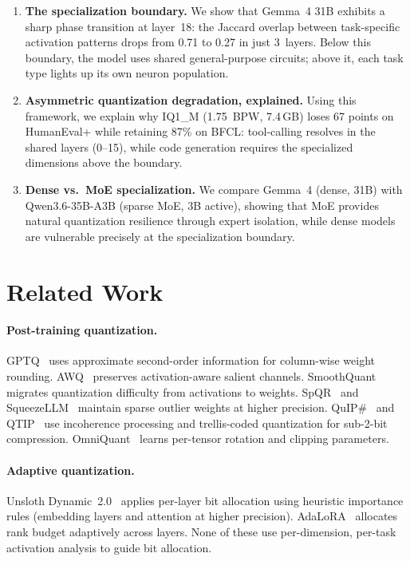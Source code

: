 \documentclass[11pt,a4paper]{article}
\begin{document}
\begin{enumerate}[leftmargin=*,itemsep=2pt]
\item \textbf{The specialization boundary.} We show that Gemma~4 31B exhibits a sharp phase transition at layer~18: the Jaccard overlap between task-specific activation patterns drops from 0.71 to 0.27 in just 3~layers. Below this boundary, the model uses shared general-purpose circuits; above it, each task type lights up its own neuron population.

\item \textbf{Asymmetric quantization degradation, explained.} Using this framework, we explain why IQ1\_M (1.75~BPW, 7.4\,GB) loses 67 points on HumanEval+ while retaining 87\% on BFCL: tool-calling resolves in the shared layers (0--15), while code generation requires the specialized dimensions above the boundary.

\item \textbf{Dense vs.\ MoE specialization.} We compare Gemma~4 (dense, 31B) with Qwen3.6-35B-A3B (sparse MoE, 3B active), showing that MoE provides natural quantization resilience through expert isolation, while dense models are vulnerable precisely at the specialization boundary.
\end{enumerate}

\section{Related Work}

\paragraph{Post-training quantization.} GPTQ~\citep{frantar2023gptq} uses approximate second-order information for column-wise weight rounding. AWQ~\citep{lin2024awq} preserves activation-aware salient channels. SmoothQuant~\citep{xiao2023smoothquant} migrates quantization difficulty from activations to weights. SpQR~\citep{dettmers2024spqr} and SqueezeLLM~\citep{kim2024squeezellm} maintain sparse outlier weights at higher precision. QuIP\#~\citep{tseng2024quipsharp} and QTIP~\citep{tseng2024qtip} use incoherence processing and trellis-coded quantization for sub-2-bit compression. OmniQuant~\citep{shao2024omniquant} learns per-tensor rotation and clipping parameters.

\paragraph{Adaptive quantization.} Unsloth Dynamic~2.0~\citep{unsloth2025} applies per-layer bit allocation using heuristic importance rules (embedding layers and attention at higher precision). AdaLoRA~\citep{zhang2023adalora} allocates rank budget adaptively across layers. None of these use per-dimension, per-task activation analysis to guide bit allocation.
\end{document}
